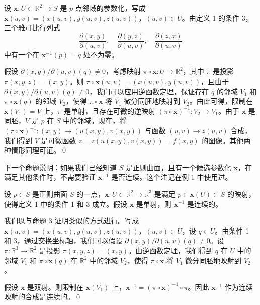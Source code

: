 \begin{Proof}
设 $\mathbf{x}: U \subset \mathbb{R}^2 \to S$ 是 $p$ 点邻域的参数化，写成 $\mathbf{x}(u,v) = (x(u,v), y(u,v), z(u,v))$，$(u,v) \in U$。由定义 1 的条件 3，三个雅可比行列式
\[
\frac{\partial(x,y)}{\partial(u,v)},\quad \frac{\partial(y,z)}{\partial(u,v)},\quad \frac{\partial(z,x)}{\partial(u,v)}
\]
中有一个在 $\mathbf{x}^{-1}(p) = q$ 处不为零。

假设 $\partial(x,y)/\partial(u,v)(q) \neq 0$，考虑映射 $\pi \circ \mathbf{x}: U \to \mathbb{R}^2$，其中 $\pi$ 是投影 $\pi(x,y,z) = (x,y)$。则 $\pi \circ \mathbf{x}(u,v) = (x(u,v), y(u,v))$，且由于 $\partial(x,y)/\partial(u,v)(q) \neq 0$，我们可以应用逆函数定理，保证存在 $q$ 的邻域 $V_1$ 和 $\pi \circ \mathbf{x}(q)$ 的邻域 $V_2$，使得 $\pi \circ \mathbf{x}$ 将 $V_1$ 微分同胚地映射到 $V_2$。由此可得，限制在 $\mathbf{x}(V_1) = V$ 上，$\pi$ 是单射，且存在可微的逆映射 $(\pi \circ \mathbf{x})^{-1}: V_2 \to V_1$。由于 $\mathbf{x}$ 是同胚，$V$ 是 $p$ 在 $S$ 中的邻域。现在，将 $(\pi \circ \mathbf{x})^{-1}: (x,y) \to (u(x,y), v(x,y))$ 与函数 $(u,v) \to z(u,v)$ 合成，我们得到 $V$ 是可微函数 $z = z(u(x,y), v(x,y)) = f(x,y)$ 的图像。其他两种情形同理可证。\qed
\end{Proof}

下一个命题说明：如果我们已经知道 $S$ 是正则曲面，且有一个候选参数化 $\mathbf{x}$，在满足其他条件时，不需要验证 $\mathbf{x}^{-1}$ 是否连续。这个注记在例 1 中使用过。

\begin{Proposition}[单射保证逆连续]\label{prop:inverse-continuous}
设 $p \in S$ 是正则曲面 $S$ 的一点，$\mathbf{x}: U \subset \mathbb{R}^2 \to \mathbb{R}^3$ 是满足 $p \in \mathbf{x}(U) \subset S$ 的映射，使得定义 1 中的条件 1 和 3 成立。假设 $\mathbf{x}$ 是单射，则 $\mathbf{x}^{-1}$ 是连续的。
\end{Proposition}

\begin{Proof}
我们以与命题 3 证明类似的方式进行。写成 $\mathbf{x}(u,v) = (x(u,v), y(u,v), z(u,v))$，$(u,v) \in U$，设 $q \in U$。由条件 1 和 3，通过交换坐标轴，我们可以假设 $\partial(x,y)/\partial(u,v)(q) \neq 0$。设 $\pi: \mathbb{R}^3 \to \mathbb{R}^2$ 是投影 $\pi(x,y,z) = (x,y)$。由逆函数定理，我们得到 $q$ 在 $U$ 中的邻域 $V_1$ 和 $\pi \circ \mathbf{x}(q)$ 在 $\mathbb{R}^2$ 中的邻域 $V_2$，使得 $\pi \circ \mathbf{x}$ 将 $V_1$ 微分同胚地映射到 $V_2$。

假设 $\mathbf{x}$ 是双射。则限制在 $\mathbf{x}(V_1)$ 上，$\mathbf{x}^{-1} = (\pi \circ \mathbf{x})^{-1} \circ \pi$。因此 $\mathbf{x}^{-1}$ 作为连续映射的合成是连续的。\qed
\end{Proof}

